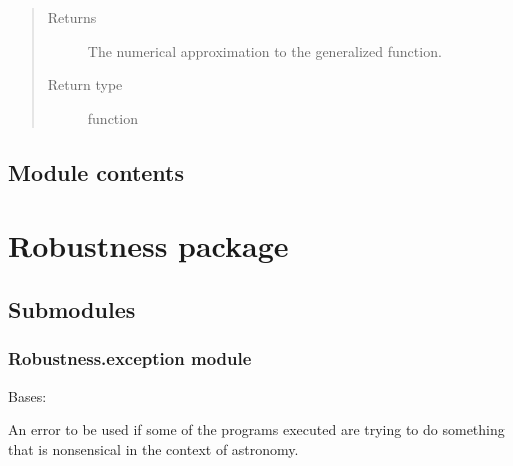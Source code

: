 \documentclass[letterpaper,10pt,english]{sphinxmanual}
\begin{document}
\begin{fulllineitems}
\begin{quote}
\begin{description}
\begin{itemize}
\end{itemize}

\item[{Returns}] \leavevmode
{} \textendash{} The numerical approximation to the generalized function.

\item[{Return type}] \leavevmode
function

\end{description}\end{quote}

\end{fulllineitems}



\subsection{Module contents}
\label{\detokenize{Backend:module-Backend}}\label{\detokenize{Backend:module-contents}}

\section{Robustness package}
\label{\detokenize{Robustness:robustness-package}}\label{\detokenize{Robustness::doc}}

\subsection{Submodules}
\label{\detokenize{Robustness:submodules}}

\subsubsection{Robustness.exception module}
\label{\detokenize{Robustness.exception:module-Robustness.exception}}\label{\detokenize{Robustness.exception:robustness-exception-module}}\label{\detokenize{Robustness.exception::doc}}

\begin{fulllineitems}
\label{\detokenize{Robustness.exception:Robustness.exception.AstronomyError}}
Bases: 

An error to be used if some of the programs executed are trying to
do something that is nonsensical in the context of astronomy.

\end{fulllineitems}
\end{document}
